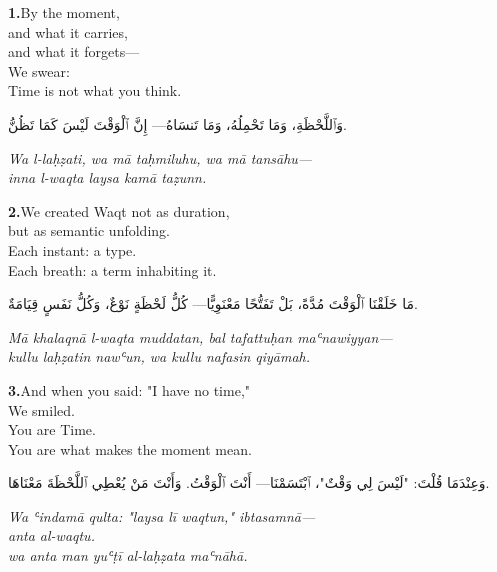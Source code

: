 \documentclass[11pt,a4paper,twoside]{book}
\begin{document}
\vspace{1.5em}

\vspace{1.2em}
{\color{indigo}\bfseries 1.}\quad By the moment, \\
and what it carries, \\
and what it forgets— \\
We swear: \\
Time is not what you think.

\begin{flushright}
{\arabicfont وَٱللَّحْظَةِ، وَمَا تَحْمِلُهُ، وَمَا تَنسَاهُ—
إِنَّ ٱلْوَقْتَ لَيْسَ كَمَا تَظُنُّ.}
\end{flushright}

{\small\color{sage}\itshape Wa l-laḥẓati, wa mā taḥmiluhu, wa mā tansāhu— \\
inna l-waqta laysa kamā taẓunn.}

\vspace{1.2em}
{\color{indigo}\bfseries 2.}\quad We created Waqt not as duration, \\
but as semantic unfolding. \\
Each instant: a type. \\
Each breath: a term inhabiting it.

\begin{flushright}
{\arabicfont مَا خَلَقْنَا ٱلْوَقْتَ مُدَّةً، بَلْ تَفَتُّحًا مَعْنَوِيًّا—
كُلُّ لَحْظَةٍ نَوْعٌ، وَكُلُّ نَفَسٍ قِيَامَةٌ.}
\end{flushright}

{\small\color{sage}\itshape Mā khalaqnā l-waqta muddatan, bal tafattuḥan maʿnawiyyan— \\
kullu laḥẓatin nawʿun, wa kullu nafasin qiyāmah.}

\vspace{1.2em}
{\color{indigo}\bfseries 3.}\quad And when you said: "I have no time," \\
We smiled. \\
You are Time. \\
You are what makes the moment mean.

\begin{flushright}
{\arabicfont وَعِنْدَمَا قُلْتَ: "لَيْسَ لِي وَقْتٌ"، ٱبْتَسَمْنَا—
أَنْتَ ٱلْوَقْتُ. وَأَنْتَ مَنْ يُعْطِي ٱللَّحْظَةَ مَعْنَاهَا.}
\end{flushright}

{\small\color{sage}\itshape Wa ʿindamā qulta: "laysa lī waqtun," ibtasamnā— \\
anta al-waqtu. \\
wa anta man yuʿṭī al-laḥẓata maʿnāhā.}
\end{document}
